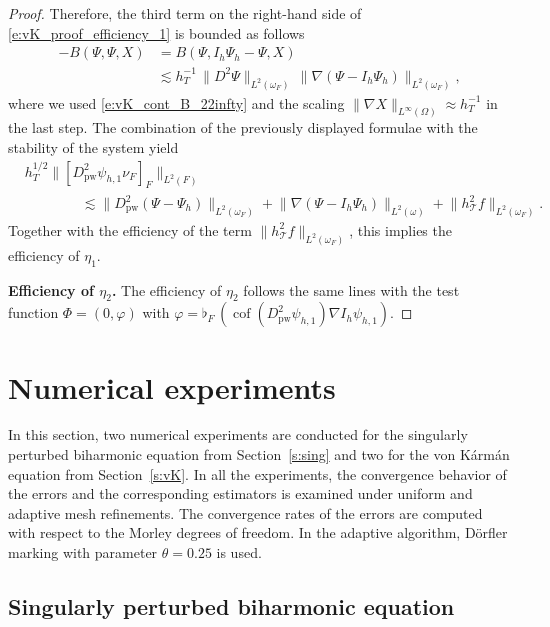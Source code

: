 \documentclass[a4paper]{amsart}
\theoremstyle{definition}
\numberwithin{equation}{section}
\numberwithin{theorem}{section}
\newcommand{\pw}{\mathrm{pw}}
\newcommand{\tri}{\mathcal{T}}
\newcommand{\cof}{\operatorname{cof}}
\begin{document}
\begin{proof}
    Therefore, the third term on the right-hand side of 
    \eqref{e:vK_proof_efficiency_1} is bounded as follows
    \begin{align*}
        -B(\Psi,\Psi,X)
        &= B(\Psi,I_h\Psi_h-\Psi,X)\\
        &\lesssim h_T^{-1}\,\lVert D^2\Psi\rVert_{L^2(\omega_F)}
            \,\lVert \nabla(\Psi- I_h\Psi_h)\rVert_{L^2(\omega_F)},
    \end{align*}
    where we used \eqref{e:vK_cont_B_22infty} and the scaling 
    $\lVert\nabla X\rVert_{L^\infty(\Omega)}\approx h_T^{-1}$ in the last step.
    The combination of the previously displayed formulae 
    with the stability of the system yield 
    \begin{align*}
        &h_T^{1/2}\lVert [D_\pw^2 \psi_{h,1}\nu_F]_F\rVert_{L^2(F)}\\
        &\qquad\qquad
        \lesssim \lVert D_\pw^2(\Psi-\Psi_h)\rVert_{L^2(\omega_F)}
        + \lVert \nabla(\Psi- I_h\Psi_h)\rVert_{L^2(\omega)}
        + \lVert h_\tri^2 f\rVert_{L^2(\omega_F)} .
    \end{align*}
    Together with the efficiency of the term 
    $\lVert h_\tri^2 f\rVert_{L^2(\omega_F)}$, this implies the 
    efficiency of $\eta_1$.

    \textbf{Efficiency of $\eta_2$.}
    The efficiency of $\eta_2$ follows the same lines with the 
    test function $\Phi=(0,\varphi)$ with 
    $\varphi = \flat_F\,(\cof(D_\pw^2 \psi_{h,1})\nabla I_h\psi_{h,1})$.
\end{proof}

\section{Numerical experiments}
\label{s:num}
In this section, two numerical experiments are conducted for the singularly 
perturbed biharmonic equation from Section~\ref{s:sing}
and two for the von K{\'a}rm{\'a}n equation from Section~\ref{s:vK}. 
In all the experiments, the convergence behavior of the errors and the corresponding estimators is examined under uniform and adaptive mesh refinements. 
The convergence rates of the errors are computed with respect to the Morley degrees of freedom. 
In the adaptive algorithm, D{\"o}rfler marking
\cite{Doerfler1996} with parameter $\theta = 0.25$ is used.

\subsection{Singularly perturbed biharmonic equation}
\end{document}
